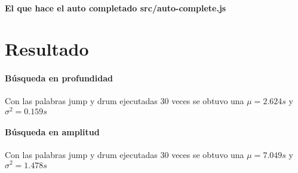 \documentclass[40pt,a4paper]{article}
\begin{document}
\paragraph{El que hace el auto completado src/auto-complete.js}


\section{Resultado}

\paragraph{Búsqueda en profundidad}
Con las palabras jump y drum ejecutadas 30 veces se obtuvo
una $\mu = 2.624s$ y $\sigma^2 = 0.159s$

\paragraph{Búsqueda en amplitud}
Con las palabras jump y drum ejecutadas 30 veces se obtuvo
una $\mu = 7.049s$ y $\sigma^2 = 1.478s$
\end{document}
